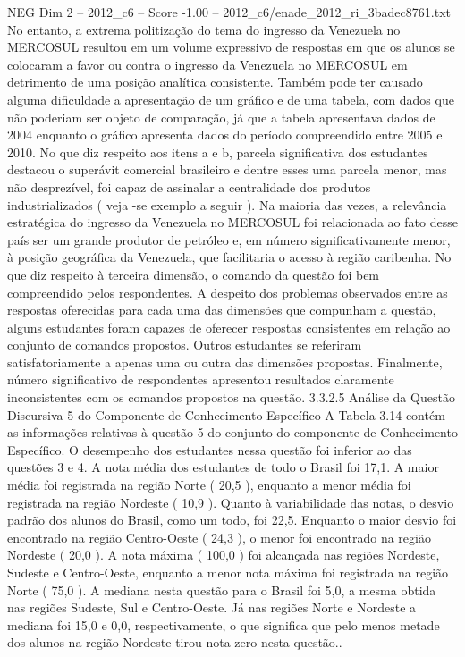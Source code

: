\begin{textsample}{NEG Dim 2 – 2012\_c6 – Score -1.00 – 2012\_c6/enade\_2012\_ri\_3badec8761.txt}
No entanto, a extrema politização do tema do ingresso da Venezuela no MERCOSUL resultou em um volume expressivo de respostas em que os alunos se colocaram a favor ou contra o ingresso da Venezuela no MERCOSUL em detrimento de uma posição analítica consistente.
Também pode ter causado alguma dificuldade a apresentação de um gráfico e de uma tabela, com dados que não poderiam ser objeto de comparação, já que a tabela apresentava dados de 2004 enquanto o gráfico apresenta dados do período compreendido entre 2005 e 2010.
No que diz respeito aos itens a e b, parcela significativa dos estudantes destacou o superávit comercial brasileiro e dentre esses uma parcela menor, mas não desprezível, foi capaz de assinalar a centralidade dos produtos industrializados ( veja -se exemplo a seguir ).
Na maioria das vezes, a relevância estratégica do ingresso da Venezuela no MERCOSUL foi relacionada ao fato desse país ser um grande produtor de petróleo e, em número significativamente menor, à posição geográfica da Venezuela, que facilitaria o acesso à região caribenha.
No que diz respeito à terceira dimensão, o comando da questão foi bem compreendido pelos respondentes.
A despeito dos problemas observados entre as respostas oferecidas para cada uma das dimensões que compunham a questão, alguns estudantes foram capazes de oferecer respostas consistentes em relação ao conjunto de comandos propostos.
Outros estudantes se referiram satisfatoriamente a apenas uma ou outra das dimensões propostas.
Finalmente, número significativo de respondentes apresentou resultados claramente inconsistentes com os comandos propostos na questão. 3.3.2.5 Análise da Questão Discursiva 5 do Componente de Conhecimento Específico A Tabela 3.14 contém as informações relativas à questão 5 do conjunto do componente de Conhecimento Específico.
O desempenho dos estudantes nessa questão foi inferior ao das questões 3 e 4.
A nota média dos estudantes de todo o Brasil foi 17,1.
A maior média foi registrada na região Norte ( 20,5 ), enquanto a menor média foi registrada na região Nordeste ( 10,9 ).
Quanto à variabilidade das notas, o desvio padrão dos alunos do Brasil, como um todo, foi 22,5.
Enquanto o maior desvio foi encontrado na região Centro-Oeste ( 24,3 ), o menor foi encontrado na região Nordeste ( 20,0 ).
A nota máxima ( 100,0 ) foi alcançada nas regiões Nordeste, Sudeste e Centro-Oeste, enquanto a menor nota máxima foi registrada na região Norte ( 75,0 ).
A mediana nesta questão para o Brasil foi 5,0, a mesma obtida nas regiões Sudeste, Sul e Centro-Oeste.
Já nas regiões Norte e Nordeste a mediana foi 15,0 e 0,0, respectivamente, o que significa que pelo menos metade dos alunos na região Nordeste tirou nota zero nesta questão..

\end{textsample}
